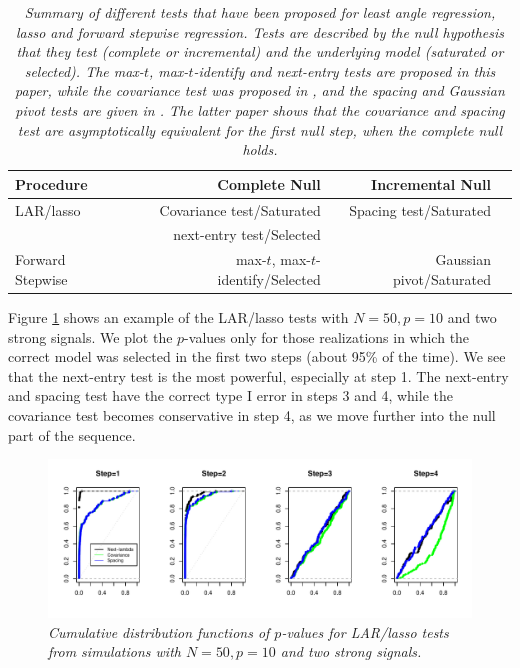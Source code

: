 \documentclass{article}
\begin{document}
\begin{table}
\begin{center}
\begin{tabular}{ | l | r|r| r}
        \hline
Procedure& Complete Null & Incremental Null\\
\hline
LAR/lasso& Covariance test/Saturated&Spacing test/Saturated \\
        & next-entry test/Selected& \\
        \hline
Forward Stepwise &max-$t$, max-$t$-identify/Selected &Gaussian pivot/Saturated\\
\hline
\end{tabular}
\end{center}
\caption{\em Summary of different tests that have been proposed for least angle regression, lasso and forward stepwise regression.
Tests are described by the null hypothesis that they test (complete or incremental)  and the underlying model (saturated or selected).
The max-$t$, max-$t$-identify and next-entry tests are proposed in this paper, while the covariance test was proposed in \citet{lockhart2014significance}, and the spacing and Gaussian
pivot tests are given in \citet{taylor2014exact}. The latter paper shows that the covariance and spacing test are asymptotically equivalent for the first null step, when the complete null holds.}
\label{tab:testsummary}
\end{table}
Figure  \ref{fig:larexample} shows an example of the LAR/lasso tests with $N=50, p=10$ and two strong signals.
We plot the $p$-values only for those realizations in which the correct model was selected in the first two steps (about 95\% of the time).
We see that the next-entry test is the most powerful, especially at step 1. The next-entry and spacing test have the correct type I error in steps 3 and 4,
while the covariance test becomes conservative in step 4, as we move further into the null part of the sequence.
\begin{figure}
  \includegraphics[width=\textwidth]{figs/larexample.pdf}
  \caption[fig:larexample]{\em  Cumulative distribution functions of $p$-values for LAR/lasso tests from simulations with $N=50,  p=10$ and two strong signals.}
  \label{fig:larexample}
\end{figure}
\end{document}
